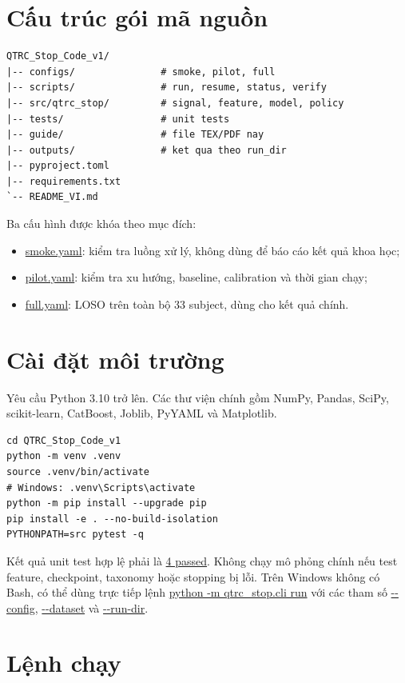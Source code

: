 \documentclass[12pt,draftclsnofoot,onecolumn]{IEEEtran}
\newcommand{\code}[1]{\url{#1}}
\begin{document}
\section{Cấu trúc gói mã nguồn}

\begin{lstlisting}
QTRC_Stop_Code_v1/
|-- configs/               # smoke, pilot, full
|-- scripts/               # run, resume, status, verify
|-- src/qtrc_stop/         # signal, feature, model, policy
|-- tests/                 # unit tests
|-- guide/                 # file TEX/PDF nay
|-- outputs/               # ket qua theo run_dir
|-- pyproject.toml
|-- requirements.txt
`-- README_VI.md
\end{lstlisting}

Ba cấu hình được khóa theo mục đích:
\begin{itemize}[leftmargin=*]
\item \code{smoke.yaml}: kiểm tra luồng xử lý, không dùng để báo cáo kết quả khoa học;
\item \code{pilot.yaml}: kiểm tra xu hướng, baseline, calibration và thời gian chạy;
\item \code{full.yaml}: LOSO trên toàn bộ 33 subject, dùng cho kết quả chính.
\end{itemize}

\section{Cài đặt môi trường}

Yêu cầu Python 3.10 trở lên. Các thư viện chính gồm NumPy, Pandas, SciPy, scikit-learn, CatBoost, Joblib, PyYAML và Matplotlib.

\begin{lstlisting}
cd QTRC_Stop_Code_v1
python -m venv .venv
source .venv/bin/activate
# Windows: .venv\Scripts\activate
python -m pip install --upgrade pip
pip install -e . --no-build-isolation
PYTHONPATH=src pytest -q
\end{lstlisting}

Kết quả unit test hợp lệ phải là \code{4 passed}. Không chạy mô phỏng chính nếu test feature, checkpoint, taxonomy hoặc stopping bị lỗi. Trên Windows không có Bash, có thể dùng trực tiếp lệnh \code{python -m qtrc_stop.cli run} với các tham số \code{--config}, \code{--dataset} và \code{--run-dir}.

\section{Lệnh chạy}
\end{document}
